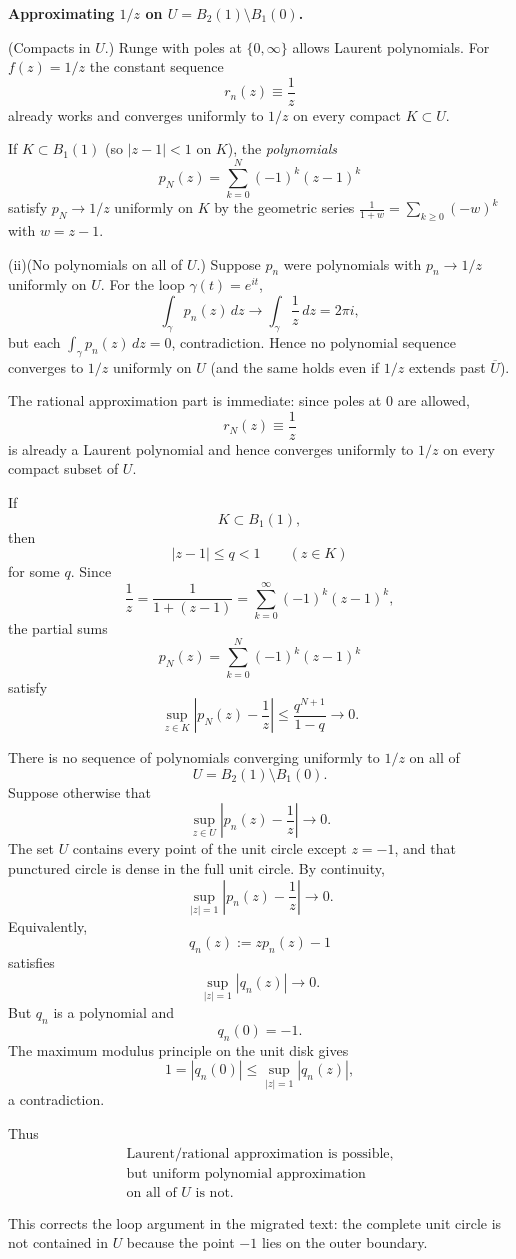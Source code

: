 \begin{problem}[CP-II-0168]
\label{prob:cp-ii-0168}
\textbf{Approximating $1/z$ on $U=B_2(1)\setminus B_1(0)$.}

 \hspace*{1.5em}(Compacts in $U$.) Runge with poles at $\{0,\infty\}$ allows Laurent polynomials.
		For $f(z)=1/z$ the constant sequence
		\[
		r_n(z)\equiv \frac{1}{z}
		\]
		already works and converges uniformly to $1/z$ on every compact $K\subset U$.

		If $K\subset B_1(1)$ (so $|z-1|<1$ on $K$), the \emph{polynomials}
		\[
		p_N(z)=\sum_{k=0}^N (-1)^k(z-1)^k
		\]
		satisfy $p_N\to 1/z$ uniformly on $K$ by the geometric series
		$\frac{1}{1+w}=\sum_{k\ge0}(-w)^k$ with $w=z-1$.

		\par\noindent (ii)\quad (No polynomials on all of $U$.) Suppose $p_n$ were polynomials with
		$p_n\to 1/z$ uniformly on $U$. For the loop $\gamma(t)=e^{it}$,
		\[
		\int_\gamma p_n(z)\,dz \longrightarrow \int_\gamma \frac{1}{z}\,dz=2\pi i,
		\]
		but each $\int_\gamma p_n(z)\,dz=0$, contradiction. Hence no polynomial sequence
		converges to $1/z$ uniformly on $U$ (and the same holds even if $1/z$ extends past $\overline U$).
\end{problem}

\begin{solution}
The rational approximation part is immediate: since poles at \(0\) are allowed,
\[
r_N(z)\equiv\frac1z
\]
is already a Laurent polynomial and hence converges uniformly to \(1/z\) on every compact subset of \(U\).

If
\[
K\subset B_1(1),
\]
then
\[
|z-1|\le q<1
\qquad(z\in K)
\]
for some \(q\). Since
\[
\frac1z
=
\frac1{1+(z-1)}
=
\sum_{k=0}^{\infty}(-1)^k(z-1)^k,
\]
the partial sums
\[
p_N(z)=\sum_{k=0}^{N}(-1)^k(z-1)^k
\]
satisfy
\[
\sup_{z\in K}
\left|
p_N(z)-\frac1z
\right|
\le
\frac{q^{N+1}}{1-q}
\longrightarrow0.
\]

There is no sequence of polynomials converging uniformly to \(1/z\) on all of
\[
U=B_2(1)\setminus B_1(0).
\]
Suppose otherwise that
\[
\sup_{z\in U}
\left|
p_n(z)-\frac1z
\right|
\longrightarrow0.
\]
The set \(U\) contains every point of the unit circle except \(z=-1\), and that punctured circle is dense in the full unit circle. By continuity,
\[
\sup_{|z|=1}
\left|
p_n(z)-\frac1z
\right|
\longrightarrow0.
\]
Equivalently,
\[
q_n(z):=zp_n(z)-1
\]
satisfies
\[
\sup_{|z|=1}|q_n(z)|\longrightarrow0.
\]
But \(q_n\) is a polynomial and
\[
q_n(0)=-1.
\]
The maximum modulus principle on the unit disk gives
\[
1
=
|q_n(0)|
\le
\sup_{|z|=1}|q_n(z)|,
\]
a contradiction.

Thus
\[
\boxed{\begin{gathered}
\text{Laurent/rational approximation is possible,}
\\
\text{but uniform polynomial approximation}
\\
\text{on all of }U\text{ is not.}
\end{gathered}}
\]

This corrects the loop argument in the migrated text: the complete unit circle is not contained in \(U\) because the point \(-1\) lies on the outer boundary.
\end{solution}


